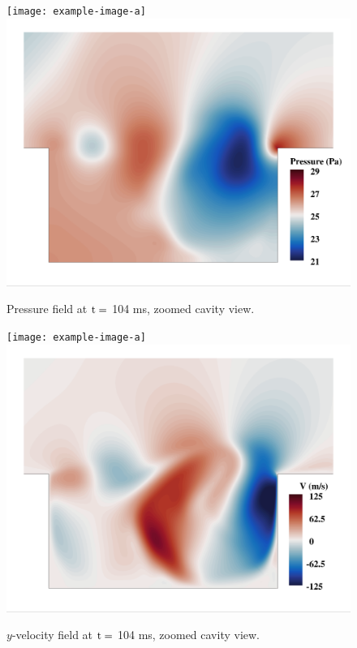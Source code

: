 \begin{figure}
	\begin{minipage}{0.48\linewidth}
		\ifdefined\DRAFT
			\texttt{[image: example-image-a]}
		\else
			\includegraphics[width=0.99\linewidth,trim={0.5em 0.5em 0.5em 0.5em},clip]{Chapters/CavityAndCVRC/Images/cavity/pressure_example_zoom.png}
		\fi
		\caption{\label{fig:cavityPressExampleZoom}Pressure field at $\text{t} =$ 104 ms, zoomed cavity view.}
	\end{minipage} \hspace{0.5em}
	\begin{minipage}{0.48\linewidth}
		\ifdefined\DRAFT
			\texttt{[image: example-image-a]}
		\else
			\includegraphics[width=0.99\linewidth,trim={0.5em 0.5em 0.5em 0.5em},clip]{Chapters/CavityAndCVRC/Images/cavity/y_vel_example_zoom.png}
		\fi
		\caption{\label{fig:cavityVExampleZoom}$y$-velocity field at $\text{t} =$ 104 ms, zoomed cavity view.}
	\end{minipage}
\end{figure}


